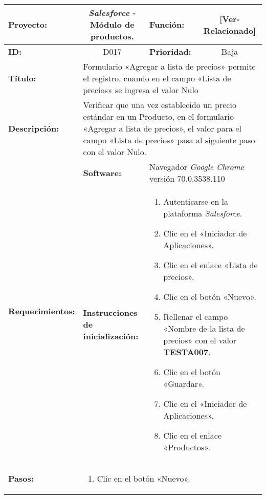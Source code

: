 \begin{table}[H]
\centering
\begin{tabular}{|p{2.5cm}|p{2.8cm}|p{2.2cm}|p{2.8cm}|p{2.2cm}|}
\hline
\footnotesize{\textbf{Proyecto:}} &
\multicolumn{2}{c|}{\footnotesize{\emph{Salesforce} - Módulo de productos.}} &
\footnotesize{\textbf{Función:}} &
\multicolumn{1}{c|}{\footnotesize{[Ver-Relacionado]}} \\
\hline
\footnotesize{\textbf{ID:}} & \multicolumn{2}{c|}{\footnotesize{D017}} &
\footnotesize{\textbf{Prioridad:}} &
\multicolumn{1}{c|}{\footnotesize{Baja}} \\
\hline
\footnotesize{\textbf{Título:}} &
\multicolumn{4}{p{12.4cm}|}{\footnotesize{Formulario «Agregar a lista de
precios» permite el registro, cuando en el campo «Lista de precios» se ingresa
el valor Nulo}} \\
\hline
\footnotesize{\textbf{Descripción:}} &
\multicolumn{4}{p{12.4cm}|}{\footnotesize{Verificar que una vez establecido un
precio estándar en un Producto, en el formulario «Agregar a lista de precios»,
el valor para el campo «Lista de precios» pasa al siguiente paso con el valor
Nulo.}} \\
\hline
\multirow{2}{*}{\footnotesize{\textbf{Requerimientos:}}} &
\footnotesize{\textbf{Software:}} &
\multicolumn{3}{p{7.8cm}|}{\footnotesize{Navegador \emph{Google Chrome}
versión 70.0.3538.110}} \\
\cline{2-5}
& \footnotesize{\textbf{Instrucciones de inicialización:}} &
\multicolumn{3}{p{7.8cm}|}{\footnotesize{
\begin{enumerate}
\item Autenticarse en la plataforma \emph{Salesforce}.
\item Clic en el «Iniciador de Aplicaciones».
\item Clic en el enlace «Lista de precios».
\item Clic en el botón «Nuevo».
\item Rellenar el campo «Nombre de la lista de precios» con el valor
    \textbf{TESTA007}.
\item Clic en el botón «Guardar».
\item Clic en el «Iniciador de Aplicaciones».
\item Clic en el enlace «Productos».
\end{enumerate}
}} \\
\hline
\footnotesize{\textbf{Pasos:}} &
\multicolumn{4}{p{11.8cm}|}{\footnotesize{
\begin{enumerate}
\item Clic en el botón «Nuevo».

\end{enumerate}}}
\end{tabular}
\end{table}
